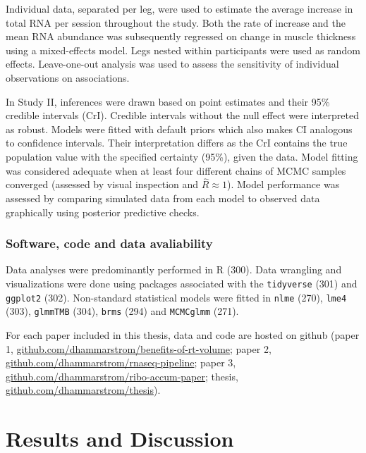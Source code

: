 \documentclass[twoside,10pt]{gihclass} %
\begin{document}
Individual data, separated per leg, were used to estimate the average increase in total RNA per session throughout the study. Both the rate of increase and the mean RNA abundance was subsequently regressed on change in muscle thickness using a mixed-effects model. Legs nested within participants were used as random effects. Leave-one-out analysis was used to assess the sensitivity of individual observations on associations.

In Study II, inferences were drawn based on point estimates and their 95\% credible intervals (CrI). Credible intervals without the null effect were interpreted as robust. Models were fitted with default priors which also makes CI analogous to confidence intervals. Their interpretation differs as the CrI contains the true population value with the specified certainty (95\%), given the data. Model fitting was considered adequate when at least four different chains of MCMC samples converged (assessed by visual inspection and \(\hat{R}\approx 1\)). Model performance was assessed by comparing simulated data from each model to observed data graphically using posterior predictive checks.

\hypertarget{software-code-and-data-avaliability}{%
\subsection{Software, code and data avaliability}\label{software-code-and-data-avaliability}}

Data analyses were predominantly performed in R (300).
Data wrangling and visualizations were done using packages associated with the
\texttt{tidyverse} (301) and \texttt{ggplot2} (302).
Non-standard statistical models were fitted in
\texttt{nlme} (270),
\texttt{lme4} (303),
\texttt{glmmTMB} (304),
\texttt{brms} (294) and
\texttt{MCMCglmm} (271).

For each paper included in this thesis, data and code are hosted on github (paper 1, \href{https://github.com/dhammarstrom/benefits-of-rt-volume}{github.com/dhammarstrom/benefits-of-rt-volume}; paper 2, \href{https://github.com/dhammarstrom/rnaseq-pipeline}{github.com/dhammarstrom/rnaseq-pipeline};
paper 3, \href{https://github.com/dhammarstrom/ribo-accum-paper}{github.com/dhammarstrom/ribo-accum-paper};
thesis, \href{https://github.com/dhammarstrom/thesis}{github.com/dhammarstrom/thesis}).

\hypertarget{results-and-discussion}{%
\chapter{Results and Discussion}\label{results-and-discussion}}
\end{document}
